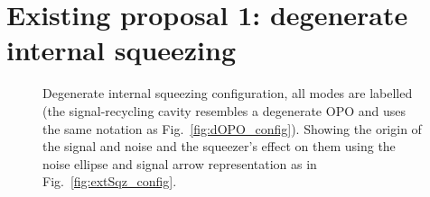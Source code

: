 \section{Existing proposal 1: degenerate internal squeezing}

\begin{figure}
	\centering
	\caption{Degenerate internal squeezing configuration, all modes are labelled (the signal-recycling cavity resembles a degenerate OPO and uses the same notation as Fig.~\ref{fig:dOPO_config}). Showing the origin of the signal and noise and the squeezer's effect on them using the noise ellipse and signal arrow representation as in Fig.~\ref{fig:extSqz_config}.}
	\label{fig:dIS_config}
\end{figure}


